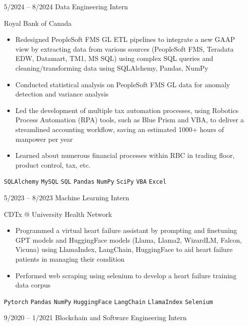 \documentclass[9pt]{developercv} %
\begin{document}
\vspace{-10 pt}
\begin{entrylist}
    \entry
        {5/2024 -- 8/2024}
		{Data Engineering Intern}
		{}
		{\vspace{-10pt}
  
       Royal Bank of Canada
        \vspace{5pt}
        \begin{itemize}[noitemsep,topsep=0pt,parsep=0pt,partopsep=0pt, leftmargin=-1pt]
            \item Redesigned PeopleSoft FMS GL ETL pipelines to integrate a new GAAP view by extracting data from various sources (PeopleSoft FMS, Teradata EDW, Datamart, TM1, MS SQL) using complex SQL queries and cleaning/transforming data using SQLAlchemy, Pandas, NumPy
            \item Conducted statistical analysis on PeopleSoft FMS GL data for anomaly detection and variance analysis
            \item Led the development of multiple tax automation processes, using Robotics Process Automation (RPA) tools,  such as Blue Prism and VBA, to deliver a streamlined accounting workflow,  saving an estimated 1000+ hours of manpower per year
            \item Learned about numerous financial processes within RBC in trading floor, product control, tax, etc.
        \end{itemize} 
        \vspace{5pt}
        \texttt{SQLAlchemy} \slashsep \texttt{MySQL} \slashsep \texttt{SQL} \slashsep \texttt{Pandas} \slashsep \texttt{NumPy} \slashsep \texttt{SciPy} \slashsep \texttt{VBA} \slashsep \texttt{Excel}}
	\entry
        {5/2023 -- 8/2023}
		{Machine Learning Intern}
		{}
		{\vspace{-10pt}
  
        CDTx @ University Health Network
        \vspace{5pt}
        \begin{itemize}[noitemsep,topsep=0pt,parsep=0pt,partopsep=0pt, leftmargin=-1pt]
            \item Programmed a virtual heart failure assistant by prompting and finetuning GPT models and HuggingFace models (Llama, Llama2, WizardLM, Falcon, Vicuna) using LlamaIndex, LangChain, HuggingFace to aid heart failure patients in managing their condition
            \item Performed web scraping using selenium to develop a heart failure training data corpus
        \end{itemize} 
        \vspace{5pt}
        \texttt{Pytorch} \slashsep \texttt{Pandas} \slashsep \texttt{NumPy} \slashsep \texttt{HuggingFace} \slashsep \texttt{LangChain} \slashsep \texttt{LlamaIndex} \slashsep \texttt{Selenium}}
        \entry
		{9/2020 -- 1/2021}
		{Blockchain and Software Engineering Intern}
		{}
		{\vspace{-10pt}
  
}
\end{entrylist}
\end{document}
